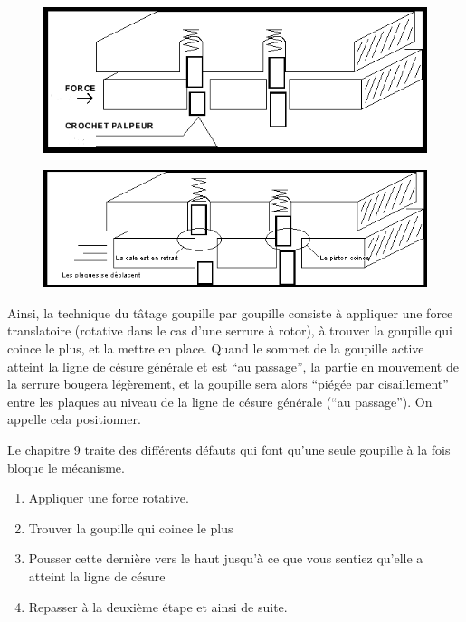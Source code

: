 \documentclass[a4paper,french,11pt,twoside]{report}
\begin{document}
\begin{figure}[h] \begin{center}
        \includegraphics[width=16cm]{images/Image7}
        \caption{}
\end{center} \end{figure}

\begin{figure}[h] \begin{center}
        \includegraphics[width=16cm]{images/Image8}
        \caption{}
\end{center} \end{figure}


Ainsi, la technique du tâtage goupille par goupille consiste à appliquer une force translatoire (rotative dans le cas d'une serrure à rotor), à trouver la goupille qui coince le plus, et la mettre en place. Quand le sommet de la goupille active atteint la ligne de césure générale et est \enquote{au passage}, la partie en mouvement de la serrure bougera légèrement, et la goupille sera alors \enquote{piégée par cisaillement} entre les plaques au niveau de la ligne de césure générale (\enquote{au passage}). On appelle cela positionner.

Le chapitre 9 traite des différents défauts qui font qu'une seule goupille à la fois bloque le mécanisme.

\begin{enumerate}
    \item{Appliquer une force rotative.}
    \item{Trouver la goupille qui coince le plus}
    \item{Pousser cette dernière vers le haut jusqu'à ce que vous sentiez qu'elle a atteint la ligne de césure}
    \item{Repasser à la deuxième étape et ainsi de suite. }
\end{enumerate}
\end{document}
